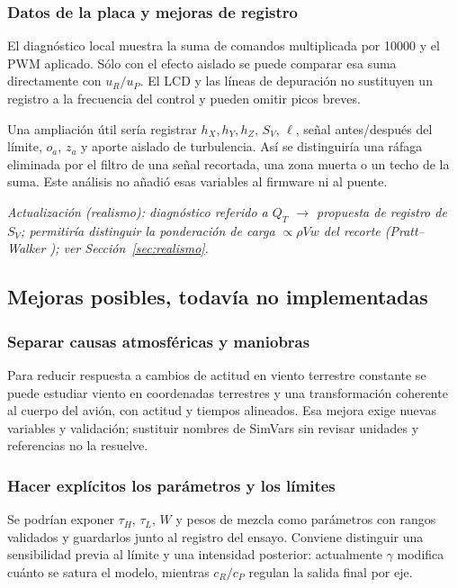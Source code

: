 \subsubsection{Datos de la placa y mejoras de registro}
El diagnóstico local  muestra la suma de comandos multiplicada por 10000 y  el PWM aplicado. Sólo con el efecto aislado se puede comparar esa suma directamente con $u_R/u_P$. El LCD y las líneas de depuración no sustituyen un registro a la frecuencia del control y pueden omitir picos breves.

Una ampliación útil sería registrar $h_X,h_Y,h_Z$, $S_V$, $\ell$, señal antes/después del límite, $o_a$, $z_a$ y aporte aislado de turbulencia. Así se distinguiría una ráfaga eliminada por el filtro de una señal recortada, una zona muerta o un techo de la suma. Este análisis no añadió esas variables al firmware ni al puente.

\textit{Actualización (realismo): diagnóstico referido a $Q_T$ $\rightarrow$ propuesta de registro de $S_V$; permitiría distinguir la ponderación de carga $\propto\rho Vw$ del recorte (Pratt--Walker \cite{pratt1954}); ver Sección~\ref{sec:realismo}.}

\subsection{Mejoras posibles, todavía no implementadas}
\subsubsection{Separar causas atmosféricas y maniobras}
Para reducir respuesta a cambios de actitud en viento terrestre constante se puede estudiar viento en coordenadas terrestres y una transformación coherente al cuerpo del avión, con actitud y tiempos alineados. Esa mejora exige nuevas variables y validación; sustituir nombres de SimVars sin revisar unidades y referencias no la resuelve.

\subsubsection{Hacer explícitos los parámetros y los límites}
Se podrían exponer $\tau_H$, $\tau_L$, $W$ y pesos de mezcla como parámetros con rangos validados y guardarlos junto al registro del ensayo. Conviene distinguir una sensibilidad previa al límite y una intensidad posterior: actualmente $\gamma$ modifica cuánto se satura el modelo, mientras $c_R/c_P$ regulan la salida final por eje.

